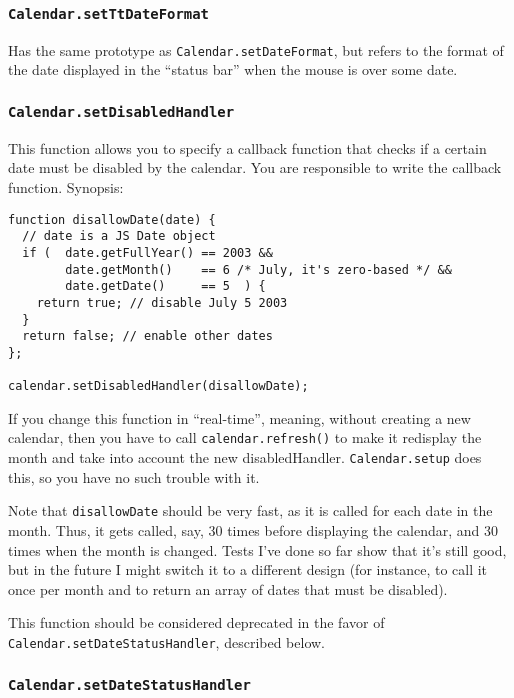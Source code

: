 \documentclass[a4paper,10pt]{article}
\begin{document}
\subsubsection{\texttt{Calendar.setTtDateFormat}}\label{sec:Calendar.setTtDateFormat}

Has the same prototype as \texttt{Calendar.setDateFormat}, but refers to the
format of the date displayed in the ``status bar'' when the mouse is over some
date.

\subsubsection{\texttt{Calendar.setDisabledHandler}}\label{sec:Calendar.setDisabledHandler}

This function allows you to specify a callback function that checks if a
certain date must be disabled by the calendar.  You are responsible to write
the callback function.  Synopsis:

\begin{verbatim}
function disallowDate(date) {
  // date is a JS Date object
  if (  date.getFullYear() == 2003 &&
        date.getMonth()    == 6 /* July, it's zero-based */ &&
        date.getDate()     == 5  ) {
    return true; // disable July 5 2003
  }
  return false; // enable other dates
};

calendar.setDisabledHandler(disallowDate);
\end{verbatim}

If you change this function in ``real-time'', meaning, without creating a new
calendar, then you have to call \texttt{calendar.refresh()} to make it
redisplay the month and take into account the new disabledHandler.
\texttt{Calendar.setup} does this, so you have no such trouble with it.

Note that \texttt{disallowDate} should be very fast, as it is called for each
date in the month.  Thus, it gets called, say, 30 times before displaying the
calendar, and 30 times when the month is changed.  Tests I've done so far show
that it's still good, but in the future I might switch it to a different design
(for instance, to call it once per month and to return an array of dates that
must be disabled).

This function should be considered deprecated in the favor of
\texttt{Calendar.setDateStatusHandler}, described below.

\subsubsection{\texttt{Calendar.setDateStatusHandler}}\label{sec:Calendar.setDateStatusHandler}
\end{document}
